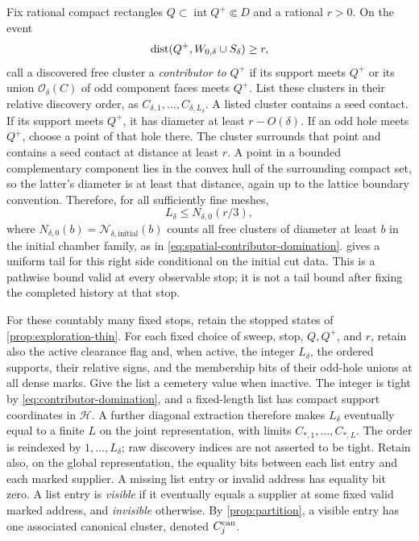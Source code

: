 Fix rational compact rectangles
\(Q\subset\operatorname{int}Q^+\Subset D\) and a rational \(r>0\).
On the event
\[
 \operatorname{dist}(Q^+,W_{0,\delta}\cup S_\delta)\geq r,
\]
call a discovered free cluster a \emph{contributor to \(Q^+\)} if
its support meets \(Q^+\) or its union \(\mathcal O_\delta(C)\) of
odd component faces meets \(Q^+\). List these clusters in their
relative discovery order, as
\(C_{\delta,1},\ldots,C_{\delta,L_\delta}\).
A listed cluster contains a seed contact. If its support meets \(Q^+\),
it has diameter at least \(r-O(\delta)\). If an odd hole meets \(Q^+\),
choose a point of that hole there. The cluster surrounds that point
and contains a seed contact at distance at least \(r\).
A point in a bounded complementary component lies in the convex hull
of the surrounding compact set, so the latter's diameter is at least
that distance, again up to the lattice boundary convention.
Therefore, for all sufficiently fine meshes,
\begin{equation}
 L_\delta\leq N_{\delta,0}(r/3),
 \label{eq:contributor-domination}
\end{equation}
where \(N_{\delta,0}(b)=\mathcal N_{\delta,\mathrm{initial}}(b)\)
counts all free clusters of diameter at least \(b\) in the initial
chamber family, as in \cref{eq:spatial-contributor-domination}.
 gives a uniform tail for this right
side conditional on the initial cut data. This is a pathwise bound
valid at every observable stop; it is not a tail bound after fixing
the completed history at that stop.

For these countably many fixed stops, retain the stopped states of
\cref{prop:exploration-thin}. For each fixed choice of sweep, stop,
\(Q,Q^+\), and \(r\), retain also the active clearance flag and,
when active, the integer \(L_\delta\),
the ordered supports, their relative signs, and the membership bits
of their odd-hole unions at all dense marks. Give the list a
cemetery value when inactive. The integer is tight by
\cref{eq:contributor-domination}, and a fixed-length list has compact
support coordinates in \(\mathscr H\). A further diagonal extraction
therefore makes \(L_\delta\) eventually equal to a finite \(L\) on
the joint representation, with limits \(C_{*,1},\ldots,C_{*,L}\).
The order is reindexed by \(1,\ldots,L_\delta\); raw discovery indices
are not asserted to be tight. Retain also, on the global representation,
the equality bits between each list entry and each marked supplier.
A missing list entry or invalid address has equality bit zero.
A list entry is \emph{visible} if it eventually equals a supplier at
some fixed valid marked address, and \emph{invisible} otherwise.
By \cref{prop:partition}, a visible entry has one associated canonical
cluster, denoted \(C_j^{\rm can}\).

